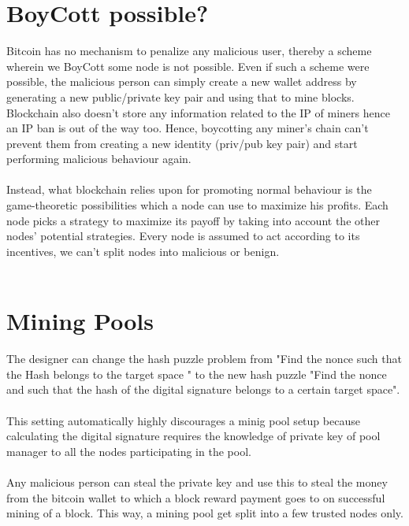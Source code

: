 \section{BoyCott possible?}

Bitcoin has no mechanism to penalize any malicious user, thereby a scheme wherein we BoyCott some node is not possible. Even if such a scheme were possible, the malicious person can simply create a new wallet address by generating a new public/private key pair and using that to mine blocks.
Blockchain also doesn't store any information related to the IP of miners hence an IP ban is out of the way too. Hence, boycotting any miner's chain can't prevent them from creating a new identity (priv/pub key pair) and start performing malicious behaviour again. \\ \\ 
Instead, what blockchain relies upon for promoting normal behaviour is the game-theoretic possibilities which a node can use to maximize his profits. Each node picks a strategy  to maximize its payoff by taking into account the other nodes' potential strategies. Every node is assumed to act according to its incentives, we can't split nodes into malicious or benign.
\\ \\ 

\section{Mining Pools}
The designer can change the hash puzzle problem from "Find the nonce such that the Hash belongs to the target space " to the new hash puzzle "Find the nonce and such that the hash of the digital signature belongs to a certain target space".  \\  \\
This setting automatically highly discourages a minig pool setup because calculating the digital signature requires the knowledge of private key of pool manager to all the nodes participating in the pool. 
\\ \\
Any malicious person can steal the private key and use this to steal the money from the bitcoin wallet to which a block reward payment goes to on successful mining of a block. This way, a mining pool get split into a few trusted nodes only.

